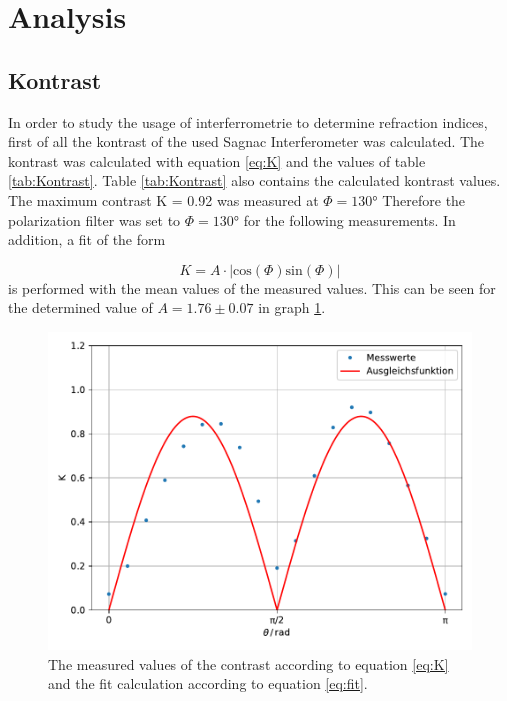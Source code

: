 \section{Analysis}
\label{sec:Auswertung}

\subsection{Kontrast}
\label{sec:Kontrast}

In order to study the usage of interferrometrie to determine refraction indices, first of all the kontrast of the used Sagnac Interferometer was calculated.
The kontrast was calculated with equation \eqref{eq:K} and the values of table \ref{tab:Kontrast}.
Table \ref{tab:Kontrast} also contains the calculated kontrast values.
The maximum contrast K = 0.92 was measured at $\Phi = 130°$
Therefore the polarization filter was set to $\Phi = 130°$ for the following measurements.
In addition, a fit of the form 

\begin{equation}
  K = A \cdot |\text{cos}(\Phi) \text{sin}(\Phi)|
  \label{eq:fit}
\end{equation}
is performed with the mean values of the measured values.
This can be seen for the determined value of $A = 1.76 \pm 0.07$ in graph \ref{fig:Kontrast_Ausgleich}.

\begin{figure}[H]
  \centering
  \includegraphics[width=\textwidth]{plots/kontrast_ausgleich.pdf}
  \caption{The measured values of the contrast according to equation \eqref{eq:K} and the fit calculation according to equation \eqref{eq:fit}.}
  \label{fig:Kontrast_Ausgleich}
\end{figure}


